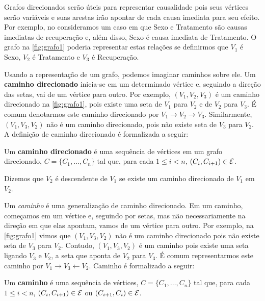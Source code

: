 Grafos direcionados serão úteis para 
representar causalidade pois 
seus vértices serão variáveis e
suas arestas irão apontar de 
cada causa imediata para seu efeito.
Por exemplo, no 
consideramos um caso em que Sexo e Tratamento são
causas imediatas de recuperação e, além disso,
Sexo é causa imediata de Tratamento.
O grafo na \cref{fig:grafo1} poderia
representar estas relações se definirmos que
$V_1$ é Sexo, $V_2$ é Tratamento e 
$V_3$ é Recuperação.

Usando a representação de um grafo,
podemos imaginar caminhos sobre ele.
Um \textbf{caminho direcionado} inicia-se 
em um determinado vértice e, 
seguindo a direção das setas, 
vai de um vértice para outro.
Por exemplo, $(V_1, V_2, V_3)$ é
um caminho direcionado na 
\cref{fig:grafo1}, pois existe
uma seta de $V_1$ para $V_2$ e
de $V_2$ para $V_3$.
É comum denotarmos este caminho direcionado por
$V_1 \rightarrow V_2 \rightarrow V_3$.
Similarmente, $(V_1, V_3, V_2)$ não é
um caminho direcionado, pois
não existe seta de $V_3$ para $V_2$.
A definição de caminho direcionado é
formalizada a seguir:

\begin{definition}
 \label{lem:caminhodir}
 Um \textbf{caminho direcionado} é 
 uma sequência de vértices em
 um grafo direcionado,
 $C = \{C_1, \ldots, C_n\}$ tal que, 
 para cada $1 \leq i < n$,
 $(C_i, C_{i+1}) \in {\mathcal E}$.
\end{definition}

\begin{definition}
 \label{def:descendente}
 Dizemos que $V_2$ é descendente de $V_1$ se
 existe um caminho direcionado de $V_1$ em $V_2$.
\end{definition}

Um \textit{caminho} é uma generalização 
de caminho direcionado.
Em um caminho, começamos em um vértice e,
seguindo por setas, mas 
não necessariamente na direção 
em que elas apontam, vamos
de um vértice para outro.
Por exemplo, na \cref{fig:grafo1}
vimos que $(V_1, V_3, V_2)$ não é um 
caminho direcionado pois não existe seta de $V_3$ para $V_2$.
Contudo, $(V_1, V_3, V_2)$ é um caminho pois
existe uma seta ligando $V_3$ e $V_2$,
a seta que aponta de $V_2$ para $V_3$.
É comum representarmos este caminho por
$V_1 \rightarrow V_3 \leftarrow V_2$.
Caminho é formalizado a seguir:

\begin{definition}
 \label{def:caminho}
 Um \textbf{caminho} é uma sequência de vértices,
 $C = \{C_1, \ldots, C_n\}$ tal que, 
 para cada $1 \leq i < n$,
 $(C_i, C_{i+1}) \in {\mathcal E}$ ou 
 $(C_{i+1}, C_{i}) \in {\mathcal E}$.
\end{definition}

